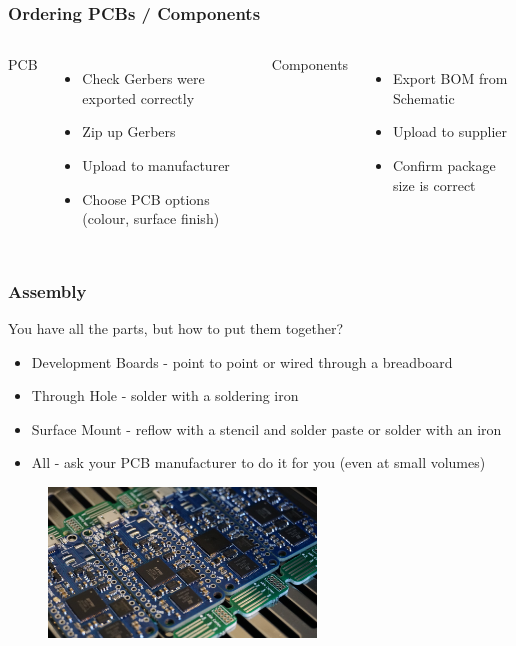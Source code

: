 \documentclass[aspectratio=169, t]{beamer}
\begin{document}
\begin{frame}
\frametitle{Ordering PCBs / Components}
\begin{columns}
	PCB
	\begin{itemize}
		\item Check Gerbers were exported correctly
		\item Zip up Gerbers
		\item Upload to manufacturer
		\item Choose PCB options (colour, surface finish)
	\end{itemize}
	
	Components
	\begin{itemize}
		\item Export BOM from Schematic
		\item Upload to supplier
		\item Confirm package size is correct
	\end{itemize}
	
\end{columns}
\end{frame}

\begin{frame}
\frametitle{Assembly}
You have all the parts, but how to put them together?
\begin{itemize}
	\item Development Boards - point to point or wired through a breadboard
	\item Through Hole - solder with a soldering iron
	\item Surface Mount - reflow with a stencil and solder paste or solder with an iron
	\item All - ask your PCB manufacturer to do it for you (even at small volumes)
\end{itemize}
\begin{figure}
	\includegraphics[height=4cm]{images/ice40-reflow.jpeg}
\end{figure}
\end{frame}
\end{document}
